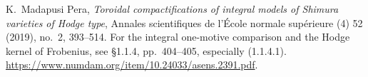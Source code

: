 K.~Madapusi Pera,
\emph{Toroidal compactifications of integral models of Shimura
varieties of Hodge type},
Annales scientifiques de l'\'Ecole normale sup\'erieure
(4) 52 (2019), no.~2, 393--514.
For the integral one-motive comparison and the Hodge kernel of
Frobenius, see \S1.1.4, pp.~404--405, especially (1.1.4.1).
\url{https://www.numdam.org/item/10.24033/asens.2391.pdf}.
